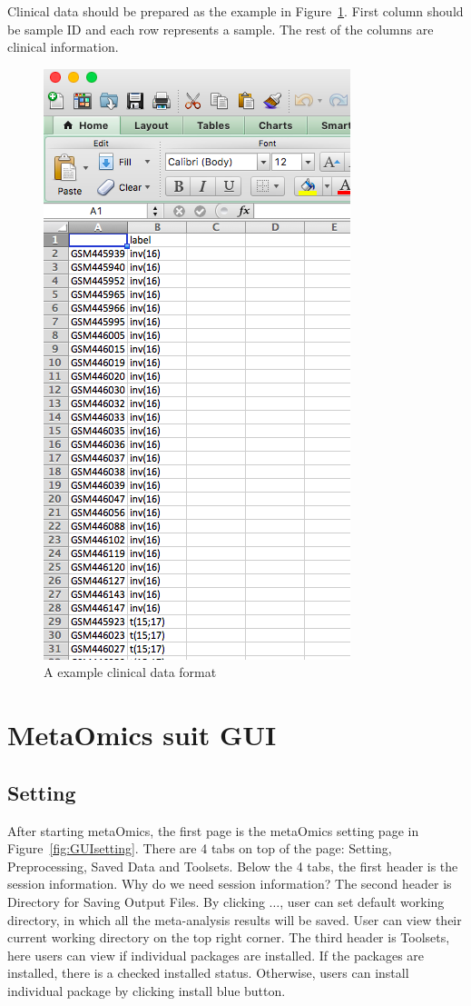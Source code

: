 \documentclass{article}
\begin{document}
Clinical data should be prepared as the example in Figure~\ref{fig:clinical}.
First column should be sample ID and each row represents a sample.
The rest of the columns are clinical information.

\begin{figure}[H]
\begin{center}
\includegraphics[scale=0.5]{./figure/clinicalData}
\caption{A example clinical data format}
\label{fig:clinical}
\end{center}
\end{figure}

\section{MetaOmics suit GUI}
\subsection{Setting}

After starting metaOmics, 
the first page is the metaOmics setting page in Figure~\ref{fig:GUIsetting}.  
There are 4 tabs on top of the page: Setting, Preprocessing, Saved Data and Toolsets.
Below the 4 tabs, 
the first header is the session information.
{
\color{red}
Why do we need session information?
}
The second header is Directory for Saving Output Files.
By clicking $\ldots$,
user can set default working directory, in which all the meta-analysis results will be saved.
User can view their current working directory on the top right corner.
The third header is Toolsets,
here users can view if individual packages are installed.
If the packages are installed, there is a checked installed status.
Otherwise, users can install individual package by clicking install blue button.
\end{document}
